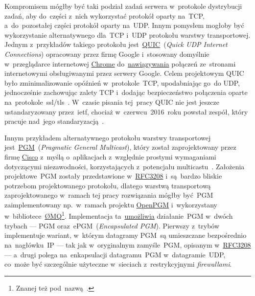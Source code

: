 \documentclass[thesis]{subfiles}
\begin{document}
Kompromisem mógłby być taki podział zadań serwera w~protokole dystrybucji zadań, aby do~części z~nich wykorzystać protokół oparty na~TCP, a~do~pozostałej części protokół oparty na~UDP. Innym pomysłem mogłoby być wykorzystanie alternatywnego dla~TCP i~UDP protokołu warstwy transportowej. Jednym z~przykładów takiego protokołu jest~\href{https://en.wikipedia.org/wiki/QUIC}{QUIC}~(\emph{Quick UDP Internet Connections}) opracowany przez firmę Google i~stosowany domyślnie w~przeglądarce internetowej \href{https://www.google.pl/chrome/}{Chrome} do~\href{https://cs.chromium.org/chromium/src/net/tools/quic/quic_server.cc}{nawiązywania} połączeń ze~stronami internetowymi obsługiwanymi przez serwery Google. Celem projektowym QUIC było zminimalizowanie opóźnień w~protokole~TCP, upodabniając go~do UDP, jednocześnie zachowując zalety TCP i~dodając bezpieczeństwo połączenia oparte na~protokole~\gls{ssl/tls}~\cite{quic-wire-layout-spec,quic-crypto,quic-roskind}. W~czasie pisania tej~pracy QUIC nie jest jeszcze ustandaryzowany przez~\gls{ietf}, chociaż w~czerwcu~2016~roku powstał zespół, który pracuje nad~jego standaryzacją~\cite{quic-draft,quic-workinggroup}.

Innym przykładem alternatywnego protokołu warstwy transportowej jest~\href{https://en.wikipedia.org/wiki/Pragmatic_General_Multicast}{PGM}~(\emph{Pragmatic General Multicast}), który został zaprojektowany przez firmę \href{http://www.cisco.com/}{Cisco} z~myślą o~aplikacjach z~względnie prostymi wymaganiami dotyczącymi niezawodności, korzystających z~potencjału multicastu~\cite{pgm-rfc}. Założenia projektowe~PGM zostały przedstawione w~\href{https://tools.ietf.org/html/rfc3208}{RFC3208} i~są~bardzo bliskie potrzebom projektowanego protokołu, dlatego warstwą transportową zaprojektowanego w~ramach tej pracy rozwiązania mógłby być~PGM zaimplementowany np.~w~ramach projektu \href{https://code.google.com/archive/p/openpgm/}{OpenPGM} i~wykorzystany w~bibliotece~\href{http://zeromq.org/}{ØMQ}\footnote{Znanej też pod~nazwą~.}. Implementacja ta~\href{http://api.zeromq.org/2-1:zmq-pgm}{umożliwia} działanie~PGM w~dwóch trybach --- PGM oraz~ePGM~(\emph{Encapsulated PGM}). Pierwszy z~trybów implementuje wariant, w~którym datagramy PGM~są umieszczane bezpośrednio na~nagłówku~IP --- tak jak w~oryginalnym zamyśle~PGM, opisanym w~\href{https://tools.ietf.org/html/rfc3208}{RFC3208} --- a~drugi polega na~enkapsulacji datagramu~PGM w~datagramie~UDP, co~może być szczególnie użyteczne w~sieciach z~restrykcyjnymi \emph{firewallami}.
\end{document}
